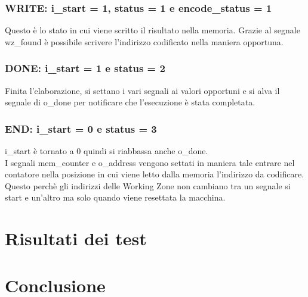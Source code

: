 \documentclass{article}
\begin{document}
\subsubsection{WRITE: {\selectfont i\_start} = 1, {\selectfont status} = 1 e {\selectfont encode\_status} = 1}
Questo è lo stato in cui viene scritto il risultato nella memoria. Grazie al segnale {\selectfont wz\_found} è possibile scrivere l'indirizzo codificato nella maniera opportuna.
\subsubsection{DONE: {\selectfont i\_start} = 1 e {\selectfont status} = 2}
Finita l'elaborazione, si settano i vari segnali ai valori opportuni e si alva il segnale di {\selectfont o\_done} per notificare che l'esecuzione è stata completata.
\subsubsection{END: {\selectfont i\_start} = 0 e {\selectfont status} = 3}
{\selectfont i\_start} è tornato a 0 quindi si riabbassa anche {\selectfont o\_done}.\\
I segnali {\selectfont mem\_counter} e {\selectfont o\_address} vengono settati in maniera tale entrare nel contatore nella posizione in cui viene letto dalla memoria l'indirizzo da codificare. Questo perchè gli indirizzi delle Working Zone non cambiano tra un segnale si start e un'altro ma solo quando viene resettata la macchina.
\pagebreak
\section{Risultati dei test}
\section{Conclusione}
\end{document}
